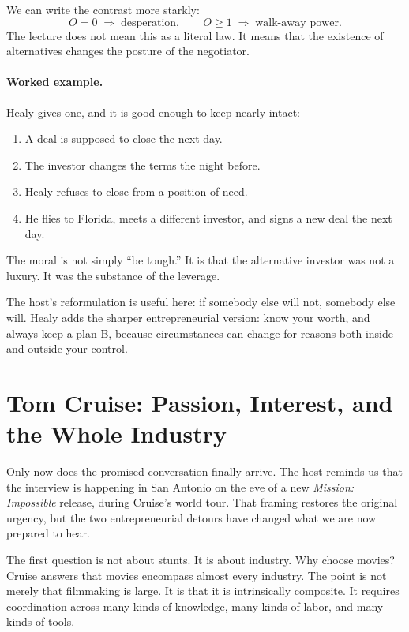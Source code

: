 We can write the contrast more starkly:
\begin{equation}
O=0 \;\Longrightarrow\; \text{desperation},
\qquad
O\ge 1 \;\Longrightarrow\; \text{walk-away power}.
\end{equation}
The lecture does not mean this as a literal law. It means that the existence of alternatives changes the posture of the negotiator.

\paragraph{Worked example.} Healy gives one, and it is good enough to keep nearly intact:
\begin{enumerate}
\item A deal is supposed to close the next day.
\item The investor changes the terms the night before.
\item Healy refuses to close from a position of need.
\item He flies to Florida, meets a different investor, and signs a new deal the next day.
\end{enumerate}
The moral is not simply ``be tough.'' It is that the alternative investor was not a luxury. It was the substance of the leverage.

The host's reformulation is useful here: if somebody else will not, somebody else will. Healy adds the sharper entrepreneurial version: know your worth, and always keep a plan B, because circumstances can change for reasons both inside and outside your control.

\section{Tom Cruise: Passion, Interest, and the Whole Industry}

Only now does the promised conversation finally arrive. The host reminds us that the interview is happening in San Antonio on the eve of a new \emph{Mission: Impossible} release, during Cruise's world tour. That framing restores the original urgency, but the two entrepreneurial detours have changed what we are now prepared to hear.

The first question is not about stunts. It is about industry. Why choose movies? Cruise answers that movies encompass almost every industry. The point is not merely that filmmaking is large. It is that it is intrinsically composite. It requires coordination across many kinds of knowledge, many kinds of labor, and many kinds of tools.

